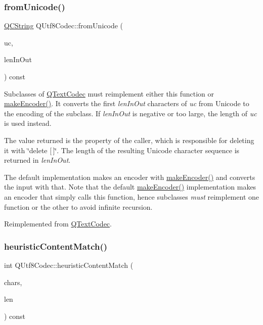 \subsubsection{\texorpdfstring{fromUnicode()}{fromUnicode()}}
{\footnotesize\ttfamily \mbox{\hyperlink{class_q_c_string}{Q\+C\+String}} Q\+Utf8\+Codec\+::from\+Unicode (\begin{DoxyParamCaption}\item[{const \mbox{\hyperlink{class_q_string}{Q\+String}} \&}]{uc,  }\item[{int \&}]{len\+In\+Out }\end{DoxyParamCaption}) const\hspace{0.3cm}{\ttfamily [virtual]}}

Subclasses of \mbox{\hyperlink{class_q_text_codec}{Q\+Text\+Codec}} must reimplement either this function or \mbox{\hyperlink{class_q_text_codec_aa7dccd7fc1b578de0b7599b040d98e11}{make\+Encoder()}}. It converts the first {\itshape len\+In\+Out} characters of {\itshape uc} from Unicode to the encoding of the subclass. If {\itshape len\+In\+Out} is negative or too large, the length of {\itshape uc} is used instead.

The value returned is the property of the caller, which is responsible for deleting it with \char`\"{}delete \mbox{[}$\,$\mbox{]}\char`\"{}. The length of the resulting Unicode character sequence is returned in {\itshape len\+In\+Out}.

The default implementation makes an encoder with \mbox{\hyperlink{class_q_text_codec_aa7dccd7fc1b578de0b7599b040d98e11}{make\+Encoder()}} and converts the input with that. Note that the default \mbox{\hyperlink{class_q_text_codec_aa7dccd7fc1b578de0b7599b040d98e11}{make\+Encoder()}} implementation makes an encoder that simply calls this function, hence subclasses {\itshape must} reimplement one function or the other to avoid infinite recursion. 

Reimplemented from \mbox{\hyperlink{class_q_text_codec_a564dc8bf15241a165a38287c1d26e48c}{Q\+Text\+Codec}}.

\mbox{\label{class_q_utf8_codec_a30b73712b3cb1d243986eb406a3b7b5b}} 
\subsubsection{\texorpdfstring{heuristicContentMatch()}{heuristicContentMatch()}}
{\footnotesize\ttfamily int Q\+Utf8\+Codec\+::heuristic\+Content\+Match (\begin{DoxyParamCaption}\item[{const char $\ast$}]{chars,  }\item[{int}]{len }\end{DoxyParamCaption}) const\hspace{0.3cm}{\ttfamily [virtual]}}

